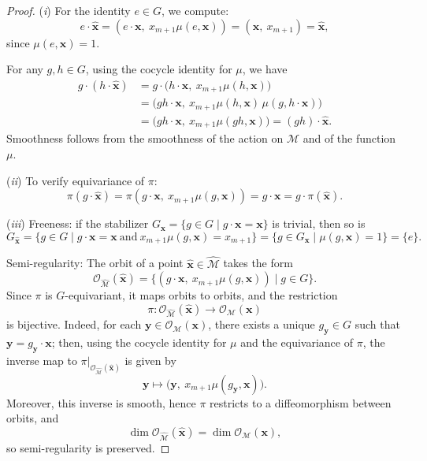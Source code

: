\documentclass[12pt,reqno]{amsart}
\begin{document}
\begin{proof}
(\textit{i}) For the identity $e \in G$, we compute:
$$
e \cdot \boldsymbol{\hat x}
= (e \cdot \boldsymbol x,\ x_{m+1} \mu(e,\boldsymbol x))
= (\boldsymbol x,\ x_{m+1}) = \boldsymbol{\hat x},
$$
since $\mu(e, \boldsymbol x) = 1$.

For any $g,h \in G$, using the cocycle identity for $\mu$, we have
\begin{align*}
g \cdot (h \cdot \boldsymbol{\hat x})
&= g \cdot \bigl(h \cdot \boldsymbol x,\ x_{m+1} \mu(h,\boldsymbol x)\bigr) \\
&= \bigl(gh \cdot \boldsymbol x,\ x_{m+1} \mu(h,\boldsymbol x)\, \mu(g, h \cdot \boldsymbol x)\bigr) \\
&= \bigl(gh \cdot \boldsymbol x,\ x_{m+1} \mu(gh,\boldsymbol x)\bigr)
= (gh) \cdot \boldsymbol{\hat x}.
\end{align*}
Smoothness follows from the smoothness of the action on $\mathcal M$ and of the function $\mu$.

\medskip

(\textit{ii}) To verify equivariance of $\pi$:
$$
\pi(g \cdot \boldsymbol{\hat x}) = \pi(g \cdot \boldsymbol x,\ x_{m+1} \mu(g,\boldsymbol x)) = g \cdot \boldsymbol x = g \cdot \pi(\boldsymbol{\hat x}).
$$

\medskip

(\textit{iii}) Freeness: if the stabilizer $G_{\boldsymbol x} = \{ g \in G \mid g \cdot \boldsymbol x = \boldsymbol x \}$ is trivial, then so is
\[
G_{\boldsymbol{\hat x}} = \{ g \in G \mid g \cdot \boldsymbol x = \boldsymbol x \ \text{and} \ x_{m+1} \mu(g, \boldsymbol x) = x_{m+1} \}
= \{ g \in G_{\boldsymbol x} \mid \mu(g,\boldsymbol x) = 1 \} = \{e\}.
\]

\medskip

Semi-regularity: The orbit of a point $\boldsymbol{\hat x} \in \widehat{\mathcal M}$ takes the form
\[
\mathcal O_{\widehat{\mathcal M}}(\boldsymbol{\hat x})
= \{ (g \cdot \boldsymbol x,\ x_{m+1} \mu(g,\boldsymbol x)) \mid g \in G \}.
\]
Since $\pi$ is $G$-equivariant, it maps orbits to orbits, and the restriction
\[
\pi : \mathcal O_{\widehat{\mathcal M}}(\boldsymbol{\hat x}) \to \mathcal O_{\mathcal M}(\boldsymbol x)
\]
is bijective. Indeed, for each $\boldsymbol y \in \mathcal O_{\mathcal M}(\boldsymbol x)$, there exists a unique $g_{\boldsymbol y} \in G$ such that $\boldsymbol y = g_{\boldsymbol y} \cdot \boldsymbol x$; then, using the cocycle identity for $\mu$ and the equivariance of $\pi$, the inverse map to $\pi|_{\mathcal O_{\widehat{\mathcal M}}(\boldsymbol{\hat x})}$ is given by
\[
\boldsymbol y \mapsto \bigl(\boldsymbol y,\ x_{m+1} \mu(g_{\boldsymbol y}, \boldsymbol x)\bigr).
\]
Moreover, this inverse is smooth, hence $\pi$ restricts to a diffeomorphism between orbits, and
\[
\dim \mathcal O_{\widehat{\mathcal M}}(\boldsymbol{\hat x}) = \dim \mathcal O_{\mathcal M}(\boldsymbol x),
\]
so semi-regularity is preserved.


\end{proof}
\end{document}
